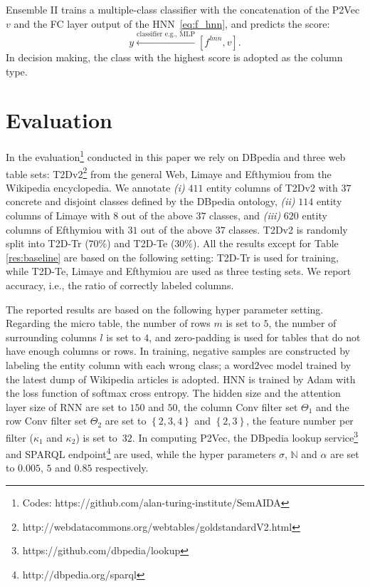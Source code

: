 \documentclass{article}
\begin{document}
Ensemble II trains a multiple-class classifier with the concatenation of the P2Vec $v$ and the FC layer output of the HNN~\eqref{eq:f_hnn},
and predicts the score: 
\begin{equation}\label{eq:ensemble2}
y \xleftarrow{\text{classifier e.g., MLP}} \left[f^{hnn}, v \right].
\end{equation}
In decision making, the class with the highest score is adopted as the column type.

\section{Evaluation}\label{sec:experiment_settings}
In the evaluation\footnote{Codes: https://github.com/alan-turing-institute/SemAIDA} conducted in this paper we rely on DBpedia and three web table sets: T2Dv2\footnote{http://webdatacommons.org/webtables/goldstandardV2.html} from the general Web, Limaye \cite{limaye2010annotating} and Efthymiou \cite{efthymiou2017matching} from the Wikipedia encyclopedia.
We annotate \textit{(i)} $411$ entity columns of T2Dv2 with $37$ concrete and disjoint classes defined by the DBpedia ontology,
\textit{(ii)} $114$ entity columns of Limaye with $8$ out of the above $37$ classes,
and \textit{(iii)} $620$ entity columns of Efthymiou with $31$ out of the above $37$ classes.
T2Dv2 is randomly split into T2D-Tr ($70\%$) and T2D-Te ($30\%$). 
All the results except for Table \ref{res:baseline} are based on the following setting: 
T2D-Tr is used for training, 
while T2D-Te, Limaye and Efthymiou
are used as three testing sets.
We report accuracy, i.e., the ratio of correctly labeled columns.





The reported results are based on the following hyper parameter setting.
Regarding the micro table, 
the number of rows $m$ is set to $5$,
the number of surrounding columns $l$ is set to $4$,
and zero-padding is used for tables that do not have enough columns or rows.
In training, 
negative samples are constructed by labeling the entity column with each wrong class;
a word2vec model \cite{mikolov2013distributed} trained by the latest dump of Wikipedia articles is adopted.
HNN is trained by Adam \cite{kingma2014adam} with the loss function of softmax cross entropy.
The hidden size and the attention layer size of RNN are set to $150$ and $50$,
the column Conv filter set $\Theta_1$ and the row Conv filter set $\Theta_2$ are set to $\left\{2,3,4\right\}$ and $\left\{2,3\right\}$,
the feature number per filter ($\kappa_1$ and $\kappa_2$) is set to~$32$.
In computing P2Vec, the
DBpedia lookup service\footnote{https://github.com/dbpedia/lookup} and SPARQL endpoint\footnote{http://dbpedia.org/sparql} are used,
while the hyper parameters $\sigma$, $\mathbb{N}$ and $\alpha$ are set to $0.005$, $5$ and $0.85$ respectively.
\end{document}
